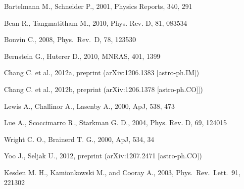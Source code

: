 \documentclass[useAMS,fleqn, usenatbib]{mn2e}
\begin{document}
%
\begin{thebibliography}{}

  Bartelmann M., Schneider P., 2001, Physics Reports, 340, 291
 
  
  Bean R., Tangmatitham M., 2010, Phys. Rev. D, 81, 083534
  
  Bonvin C.,
  2008, Phys.\ Rev.\ D, 78, 123530


  Bernstein G., Huterer D., 2010, MNRAS, 401, 1399 


  Chang C. et al., 2012a, preprint (arXiv:1206.1383 [astro-ph.IM])
  
  Chang C. et al., 2012b, preprint (arXiv:1206.1378 [astro-ph.CO]])

     Lewis A., Challinor A., Lasenby A., 2000, ApJ, 538, 473
  
  Lue A., Scoccimarro R., Starkman G. D., 2004, Phys. Rev. D, 69, 124015
  
  Wright C. O., Brainerd T. G., 2000, ApJ, 534, 34
  
  
  Yoo J., Seljak U., 2012, preprint (arXiv:1207.2471 [astro-ph.CO])

  Kesden M. H., Kamionkowski M., and Cooray A.,
  2003, Phys.\ Rev.\ Lett.\, 91, 221302
  
  

\end{thebibliography}
\end{document}
